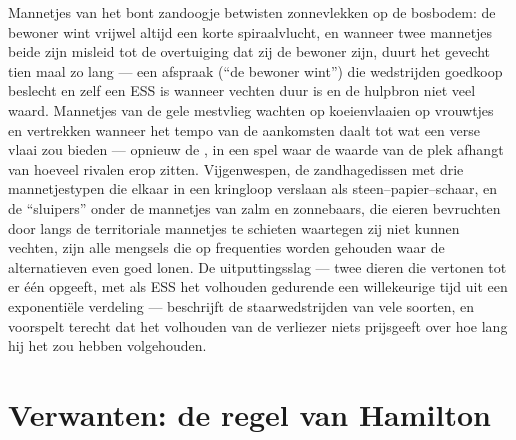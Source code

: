 \begin{example}\label{ex:b3:behavioural-ecology:games}
Mannetjes van het bont zandoogje betwisten zonnevlekken op de
bosbodem: de bewoner wint vrijwel altijd een korte spiraalvlucht, en
wanneer twee mannetjes beide zijn misleid tot de overtuiging dat zij de
bewoner zijn, duurt het gevecht tien maal zo lang --- een afspraak
(``de bewoner wint'') die wedstrijden goedkoop beslecht en zelf een ESS
is wanneer vechten duur is en de hulpbron niet veel waard. Mannetjes
van de gele mestvlieg wachten op koeienvlaaien op vrouwtjes en
vertrekken wanneer het tempo van de aankomsten daalt tot wat een verse
vlaai zou bieden --- opnieuw de , in
een spel waar de waarde van de plek afhangt van hoeveel rivalen erop
zitten. Vijgenwespen, de zandhagedissen met drie mannetjestypen die
elkaar in een kringloop verslaan als steen--papier--schaar, en de
``sluipers'' onder de mannetjes van zalm en zonnebaars, die eieren
bevruchten door langs de territoriale mannetjes te schieten waartegen
zij niet kunnen vechten, zijn alle mengsels die op frequenties worden
gehouden waar de alternatieven even goed lonen. De uitputtingsslag ---
twee dieren die vertonen tot er één opgeeft, met als ESS het volhouden
gedurende een willekeurige tijd uit een exponentiële verdeling ---
beschrijft de staarwedstrijden van vele soorten, en voorspelt terecht
dat het volhouden van de verliezer niets prijsgeeft over hoe lang hij
het zou hebben volgehouden.
\end{example}

\section{Verwanten: de regel van Hamilton}

